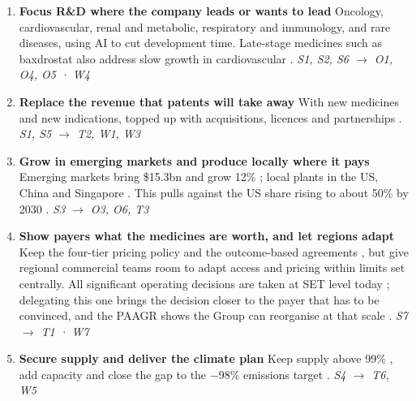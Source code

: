 \begin{enumerate}[topsep=4pt,itemsep=3pt]
  \item \textbf{Focus R\&D where the company leads or wants to lead} Oncology, cardiovascular, renal and metabolic, respiratory and immunology, and rare diseases, using AI to cut development time. Late-stage medicines such as baxdrostat also address slow growth in cardiovascular \cite[p.~17]{AR}. \textit{\small S1, S2, S6 $\rightarrow$ O1, O4, O5 · W4}
  \item \textbf{Replace the revenue that patents will take away} With new medicines and new indications, topped up with acquisitions, licences and partnerships \cite[pp.~37, 48]{AR}. \textit{\small S1, S5 $\rightarrow$ T2, W1, W3}
  \item \textbf{Grow in emerging markets and produce locally where it pays} Emerging markets bring \$15.3bn and grow 12\% \cite[pp.~4, 33]{AR}; local plants in the US, China and Singapore \cite[pp.~4, 5, 32, 37]{AR}. This pulls against the US share rising to about 50\% by 2030 \cite[p.~4]{AR}. \textit{\small S3 $\rightarrow$ O3, O6, T3}
  \item \textbf{Show payers what the medicines are worth, and let regions adapt} Keep the four-tier pricing policy and the outcome-based agreements \cite[pp.~41, 48]{AR}, but give regional commercial teams room to adapt access and pricing within limits set centrally. All significant operating decisions are taken at SET level today \cite[p.~147]{AR}; delegating this one brings the decision closer to the payer that has to be convinced, and the PAAGR shows the Group can reorganise at that scale \cite[p.~59]{AR}. \textit{\small S7 $\rightarrow$ T1 · W7}
  \item \textbf{Secure supply and deliver the climate plan} Keep supply above 99\% \cite[p.~4]{AR}, add capacity \cite[p.~33]{AR} and close the gap to the $-$98\% emissions target \cite[p.~42]{AR}. \textit{\small S4 $\rightarrow$ T6, W5}
\end{enumerate}

